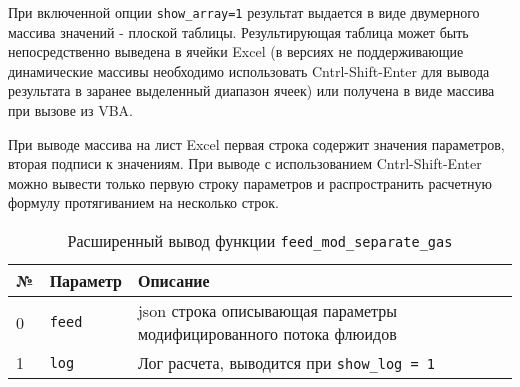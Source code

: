 При включенной опции \texttt{show_array=1} результат выдается в виде двумерного массива значений - плоской таблицы. Результирующая таблица может быть непосредственно выведена в ячейки Excel (в версиях не поддерживающие динамические массивы необходимо использовать Cntrl-Shift-Enter для вывода результата в заранее выделенный диапазон ячеек) или получена в виде массива при вызове из VBA.

При выводе массива на лист Excel первая строка содержит значения параметров, вторая подписи к значениям. При выводе с использованием Cntrl-Shift-Enter можно вывести только первую строку параметров и распространить расчетную формулу протягиванием на несколько строк.

\begin{table}[H]
	\caption{Расширенный вывод функции \texttt{feed_mod_separate_gas}}
	\label{table:param_list}
	\begin{tabular}{p{}p{}p{}}
		\hline
		№& Параметр & Описание  \\ \hline
		0 & \texttt{feed} & json строка описывающая параметры модифицированного потока флюидов    \\ \hline
		
		1 & \texttt{log} & Лог расчета, выводится при \texttt{show_log = 1}  \\ \hline
		
	\end{tabular}
\end{table}
